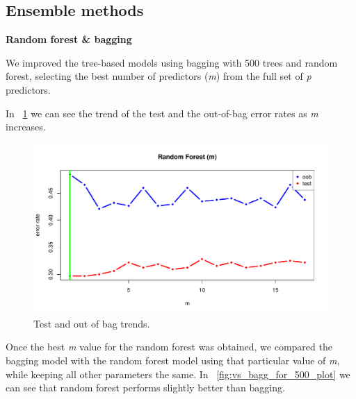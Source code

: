 \subsection{Ensemble methods}

\vspace{0.2cm}
\noindent
\textbf{Random forest \& bagging}

We improved the tree-based models using bagging with 500 trees and random forest, selecting the best number of predictors (\textit{m}) from the full set of \textit{p} predictors.

In \Fig~\ref{fig:m_best_for_500_plot} we can see the trend of the test and the out-of-bag error rates as \textit{m} increases.

\begin{figure}[H]
	\centering
	\includegraphics[width=0.5\linewidth]{ImageFiles/Classification/Trees/m_best_for_500_plot}
	\caption{Test and out of bag trends.}
	\label{fig:m_best_for_500_plot}
\end{figure}

Once the best \textit{m} value for the random forest was obtained, we compared the bagging model with the random forest model using that particular value of \textit{m}, while keeping all other parameters the same.
In \Fig~\ref{fig:vs_bagg_for_500_plot} we can see that random forest performs slightly better than bagging.

